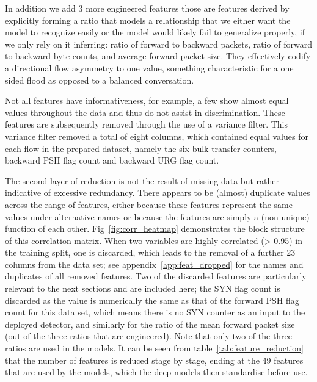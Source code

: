 In addition we add 3 more engineered features those are features derived by explicitly forming a ratio that models a relationship that we either want the model to recognize easily or the model would likely fail to generalize properly, if we only rely on it inferring: ratio of forward to backward packets, ratio of forward to backward byte counts, and average forward packet size. They effectively codify a directional flow asymmetry to one value, something characteristic for a one sided flood as opposed to a balanced conversation.
 


Not all features have informativeness, for example, a few show almost equal values throughout the data and thus do not assist in discrimination. These features are subsequently removed through the use of a variance filter. This variance filter removed a total of eight columns, which contained equal values for each flow in the prepared dataset, namely the six bulk-transfer counters, backward PSH flag count and backward URG flag count.

The second layer of reduction is not the result of missing data but rather indicative of excessive redundancy. There appears to be (almost) duplicate values across the range of features, either because these features represent the same values under alternative names or because the features are simply a (non-unique) function of each other. Fig~\ref{fig:corr_heatmap} demonstrates the block structure of this correlation matrix.
When two variables are highly correlated (> 0.95) in the training split, one is discarded, which leads to the removal of a further 23 columns from the data set; see appendix~\ref{app:feat_dropped} for the names and duplicates of all removed features.
Two of the discarded features are particularly relevant to the next sections and are included here; the SYN flag count is discarded as the value is numerically the same as that of the forward PSH flag count for this data set, which means there is no SYN counter as an input to the deployed detector, and similarly for the ratio of the mean forward packet size (out of the three ratios that are engineered). Note that only two of the three ratios are used in the models. It can be seen from table~\ref{tab:feature_reduction} that the number of features is reduced stage by stage, ending at the 49 features that are used by the models, which the deep models then standardise before use.

